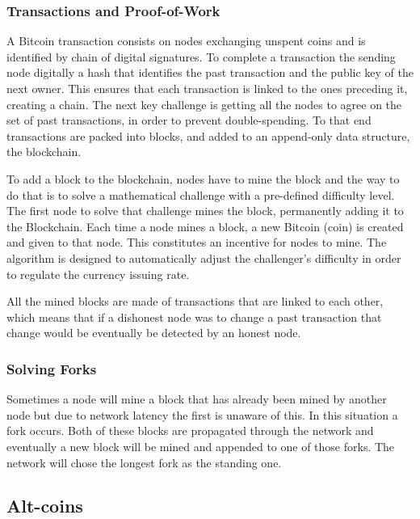\documentclass[llncsdoc]{llncs}
\begin{document}
 \subsubsection{Transactions and Proof-of-Work}
 A Bitcoin transaction consists on nodes exchanging unspent coins and is identified by chain of digital signatures. To complete a transaction the sending node digitally a hash that identifies the past transaction and the public key of the next owner. This ensures that each transaction is linked to the ones preceding it, creating a chain.
 The next key challenge is getting all the nodes to agree on the set of past transactions, in order to prevent double-spending.
 To that end transactions are packed into blocks, and added to an append-only data structure, the blockchain.
 
 To add a block to the blockchain, nodes have to mine the block and the way to do that is to solve a mathematical challenge with a pre-defined difficulty level. The first node to solve that challenge mines the block, permanently adding it to the Blockchain. Each time a node mines a block, a new Bitcoin (coin) is created and given to that node. This constitutes an incentive for nodes to mine. The algorithm is designed to automatically adjust the challenger's difficulty in order to regulate the currency issuing rate.
 
 All the mined blocks are made of transactions that are linked to each other, which means that if a dishonest node was to change a past transaction that change would be eventually be detected by an honest node.
 
 
\subsubsection{Solving Forks}
Sometimes a node will mine a block that has already been mined by another node but due to network latency the first is unaware of this. In this situation a fork occurs. Both of these blocks are propagated through the network and eventually a new block will be mined and appended to one of those forks. The network will chose the longest fork as the standing one.
 
\subsection{Alt-coins}
\end{document}
